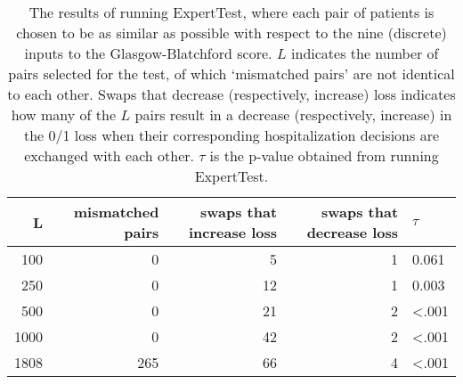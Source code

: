 \begin{table}[!htbp]
\centering
\begin{tabular}{rrrrl}
  \toprule L & mismatched pairs & swaps that increase loss & swaps that decrease loss & $\tau$ \\ 
  \midrule 100 & 0 & 5 & 1 & 0.061 \\ 
  250 & 0 & 12 & 1 & 0.003 \\ 
  500 & 0 & 21 & 2 & <.001 \\ 
  1000 & 0 & 42 & 2 & <.001 \\ 
  1808 & 265 & 66 & 4 & <.001 \\ 
   \bottomrule \end{tabular}
\caption{The results of running ExpertTest, where each pair of patients is chosen to be as similar as possible with respect to the nine (discrete) inputs to the Glasgow-Blatchford score. $L$ indicates the number of pairs selected for the test, of which `mismatched pairs' are not identical to each other.
                   Swaps that decrease (respectively, increase) loss indicates how many of the $L$ pairs result in a decrease (respectively, increase) in the 0/1 loss
                   when their corresponding hospitalization decisions are exchanged with each other. $\tau$ is the p-value obtained
                   from running ExpertTest.} 
\label{tab:testing for expertise clean}
\end{table}
